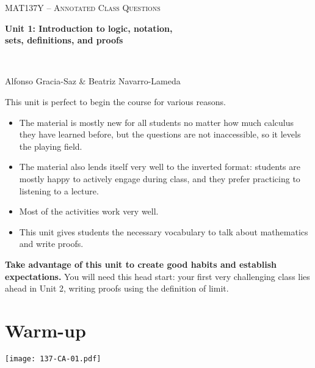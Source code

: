 \documentclass[11pt]{article}
\newcommand{\n}{\newpage}
\begin{document}
\thispagestyle{empty}
	\begin{center}
		{ {\LARGE  \scshape
		\textcolor{137cp3}{MAT137Y --   Annotated Class Questions}
		}
		
		\medskip
		{\bf \Large \textcolor{137cp1}{Unit 1: Introduction to logic, notation, \\ sets,  definitions, and proofs
		}}
		
		\
		
		\medskip
		{\large
		\textcolor{137cp1}{Alfonso Gracia-Saz \& Beatriz Navarro-Lameda}
		}}
	\end{center}

\vspace{5mm}

This unit is perfect to begin the course for various reasons.  

\medskip

\begin{itemize}
\item The material is mostly new for all students no matter how much calculus they have learned before, but the questions are not inaccessible, so it levels the playing field. 
\item The material also lends itself very well to the inverted format: students are mostly happy to actively engage during class, and they prefer practicing to listening to a lecture.  
\item Most of the activities work very well. 
\item This unit gives students the necessary vocabulary to talk about mathematics and write proofs.
\end{itemize}

\medskip

\textbf{\textcolor{137cp1}{Take advantage of this unit to create good habits and establish expectations.}}  You will need this head start: your first very challenging class lies ahead in Unit 2, writing proofs using the definition of limit.

\n

\tableofcontents

\newpage
\section{Warm-up} 

\begin{center}
{ \texttt{[image: 137-CA-01.pdf]}}
\end{center}
\end{document}
